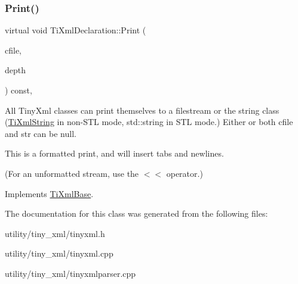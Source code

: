 \subsubsection{\texorpdfstring{Print()}{Print()}}
{\footnotesize\ttfamily virtual void Ti\+Xml\+Declaration\+::\+Print (\begin{DoxyParamCaption}\item[{F\+I\+LE $\ast$}]{cfile,  }\item[{int}]{depth }\end{DoxyParamCaption}) const\hspace{0.3cm}{\ttfamily [inline]}, {\ttfamily [virtual]}}

All Tiny\+Xml classes can print themselves to a filestream or the string class (\hyperlink{class_ti_xml_string}{Ti\+Xml\+String} in non-\/\+S\+TL mode, std\+::string in S\+TL mode.) Either or both cfile and str can be null.

This is a formatted print, and will insert tabs and newlines.

(For an unformatted stream, use the $<$$<$ operator.) 

Implements \hyperlink{class_ti_xml_base_a0de56b3f2ef14c65091a3b916437b512}{Ti\+Xml\+Base}.



The documentation for this class was generated from the following files\+:\begin{DoxyCompactItemize}
\item 
utility/tiny\+\_\+xml/tinyxml.\+h\item 
utility/tiny\+\_\+xml/tinyxml.\+cpp\item 
utility/tiny\+\_\+xml/tinyxmlparser.\+cpp\end{DoxyCompactItemize}
